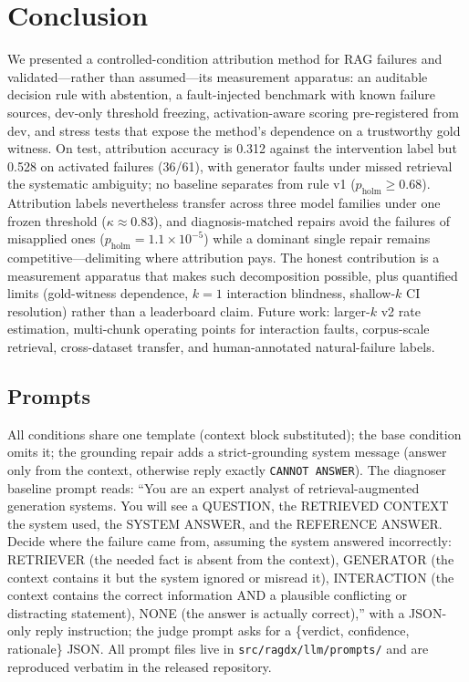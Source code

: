 \documentclass[conference]{IEEEtran}
\begin{document}
\section{Conclusion}
We presented a controlled-condition attribution method for RAG failures and
validated---rather than assumed---its measurement apparatus: an auditable
decision rule with abstention, a fault-injected benchmark with known failure
sources, dev-only threshold freezing, activation-aware scoring pre-registered
from dev, and stress tests that expose the method's dependence on a
trustworthy gold witness. On test, attribution accuracy is 0.312 against the
intervention label but 0.528 on activated failures (36/61), with generator
faults under missed retrieval the systematic ambiguity; no baseline
separates from rule v1 ($p_{\text{holm}}\ge0.68$). Attribution labels
nevertheless transfer across three model families under one frozen
threshold ($\kappa{\approx}0.83$), and diagnosis-matched repairs avoid
the failures of misapplied ones ($p_{\text{holm}}{=}1.1{\times}10^{-5}$)
while a dominant single repair remains competitive---delimiting where
attribution pays. The honest contribution
is a measurement apparatus that makes such decomposition possible, plus
quantified limits (gold-witness dependence, $k{=}1$ interaction blindness,
shallow-$k$ CI resolution)
rather than a leaderboard claim. Future work: larger-$k$ v2 rate
estimation, multi-chunk operating points for interaction faults,
corpus-scale retrieval, cross-dataset transfer, and human-annotated
natural-failure labels.

\appendix
\subsection{Prompts}
All conditions share one template (context block substituted); the base
condition omits it; the grounding repair adds a strict-grounding system
message (answer only from the context, otherwise reply exactly
\texttt{CANNOT ANSWER}). The diagnoser baseline prompt reads: ``You are an
expert analyst of retrieval-augmented generation systems. You will see a
QUESTION, the RETRIEVED CONTEXT the system used, the SYSTEM ANSWER, and the
REFERENCE ANSWER. Decide where the failure came from, assuming the system
answered incorrectly: RETRIEVER (the needed fact is absent from the
context), GENERATOR (the context contains it but the system ignored or
misread it), INTERACTION (the context contains the correct information AND
a plausible conflicting or distracting statement), NONE (the answer is
actually correct),'' with a JSON-only reply instruction; the judge prompt
asks for a \{verdict, confidence, rationale\} JSON. All prompt files live
in \texttt{src/ragdx/llm/prompts/} and are reproduced verbatim in the
released repository.
\end{document}
